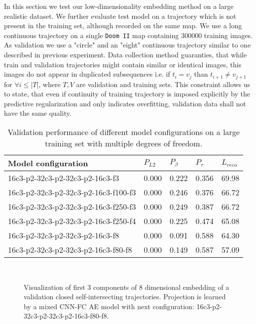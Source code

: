 In this section we test our low-dimensionality embedding method on a large realistic dataset. We further evaluate test model on a trajectory which is not present in the training set, although recorded on the same map. We use a long continuous trajectory on a single \texttt{Doom II} map containing 300000 training images.
As validation we use a "circle" and an "eight" continuous trajectory similar to one described in previous experiment.
Data collection method guaranties, that while train and validation trajectories might contain similar or identical images, this images do not appear in duplicated subsequences i.e. if $t_i = v_j$ than $t_{i+1} \neq v_{j+1}$ for $\forall i \leq |T|$, where $T, V$ are validation and training sets. This constraint allows us to state, that even if continuity of training trajectory is imposed explicitly by the predictive regularization and only indicates overfitting, validation data shall not have the same quality.

\begin{table}
\begin{center}
    \begin{tabular}{| l | l | l | l | l |}
      \hline
     Model configuration  &  $P_{L2}$ & $P_{\beta}$ & $P_{\tau}$ & $L_{reco}$ \\ \hline
     16c3-p2-32c3-p2-32c3-p2-16c3-f3     & 0.000 & 0.222 & 0.356 & 69.98 \\
     16c3-p2-32c3-p2-32c3-p2-16c3-f100-f3 & 0.000 & 0.246 & 0.376 & 66.72 \\
     16c3-p2-32c3-p2-32c3-p2-16c3-f250-f3 & 0.000 & 0.249 & 0.387 & 66.72 \\
     16c3-p2-32c3-p2-32c3-p2-16c3-f250-f4 & 0.000 & 0.225 & 0.474 & 65.08 \\
     16c3-p2-32c3-p2-32c3-p2-16c3-f8      & 0.000 & 0.091 & 0.588 & 64.30 \\
     16c3-p2-32c3-p2-32c3-p2-16c3-f80-f8  & 0.000 & 0.149 & 0.587 & 57.09 \\ \hline
     \end{tabular}
\end{center}
  \caption{Validation performance of different model configurations on a large training set with multiple degrees of freedom.}
  \label{tab:large}
\end{table}

\begin{figure}[t!]
	\centering
	\\
    	\caption{Visualization of first 3 components of 8 dimensional embedding of a validation closed self-intersecting trajectories. Projection is learned by a mixed CNN-FC AE model with next configuration: 16c3-p2-32c3-p2-32c3-p2-16c3-f80-f8.}
    	\label{fig:model_big}
\end{figure}

